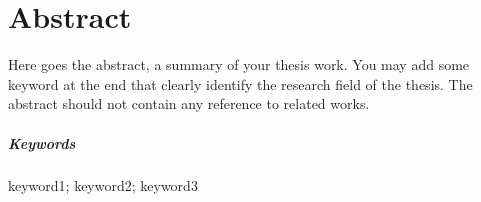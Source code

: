 \chapter{Abstract}

Here goes the abstract, a summary of your thesis work. You may add some keyword at the end that clearly identify the research field of the thesis. The abstract should not contain any reference to related works.

\paragraph{Keywords}  keyword1; keyword2; keyword3